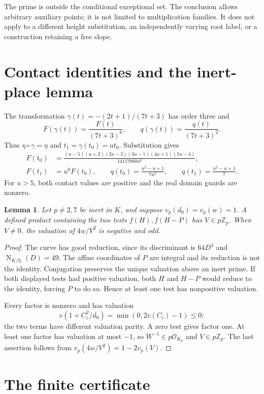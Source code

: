 \documentclass[11pt,a4paper]{article}
\newtheorem{lemma}[theorem]{Lemma}
\newcommand{\Q}{\mathbb Q}\newcommand{\Z}{\mathbb Z}
\begin{document}
The prime is outside the conditional exceptional set. The conclusion
allows arbitrary auxiliary points; it is not limited to multiplication
families. It does not apply to a different height substitution,
an independently varying root label, or a construction retaining a
free slope.

\section{Contact identities and the inert-place lemma}

The transformation \(\gamma(t)=-(2t+1)/(7t+3)\) has order three and
\[
 F(\gamma(t))=\frac{F(t)}{(7t+3)^6},\qquad
 q(\gamma(t))=\frac{q(t)}{(7t+3)^2}.
\]
Thus \(\eta\circ\gamma=\eta\) and \(t_1=\gamma(t_0)=at_0\).
Substitution gives
\begin{align*}
 F(t_0)&=\frac{(u-5)(u+2)(2u-3)(3u-1)(4u+1)(5u-4)}
                    {14117880u^6},\\
 F(t_1)&=u^6F(t_0),\qquad
 q(t_0)=\frac{u^2-u+1}{7u^2},\qquad q(t_1)=\frac{u^2-u+1}{7}.
\end{align*}
For \(u>5\), both contact values are positive and the real domain
guards are nonzero.

\begin{lemma}\label{lem:inert}
Let \(p\ne2,7\) be inert in \(K\), and suppose
\(v_p(d_0)=v_p(w)=1\). A defined product containing the two tests
\(f(H),\overline{f(H-P)}\) has \(V\in p\Z_p\).
When \(V\ne0\), the valuation of \(4w/V^2\) is negative and odd.
\end{lemma}
\begin{proof}
The curve has good reduction, since its discriminant is \(64D^3\)
and \(\operatorname{N}_{K/\Q}(D)=49\). The affine coordinates of
\(P\) are integral and its reduction is not the identity.
Conjugation preserves the unique valuation above an inert prime.
If both displayed tests had positive valuation, both \(H\) and
\(H-P\) would reduce to the identity, forcing \(P\) to do so.
Hence at least one test has nonpositive valuation.

Every factor is nonzero and has valuation
\[
 v(1+C_i^2/d_0)=\min(0,2v(C_i)-1)\le0;
\]
the two terms have different valuation parity. A zero test gives
factor one. At least one factor has valuation at most \(-1\),
so \(W^{-1}\in p\mathcal O_{K_p}\) and \(V\in p\Z_p\).
The last assertion follows from \(v_p(4w/V^2)=1-2v_p(V)\).
\end{proof}

\section{The finite certificate}
\end{document}
